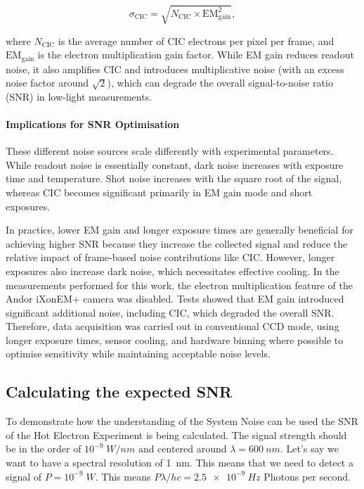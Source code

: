 \documentclass[
	parskip=half,
	a4paper,
]{scrarticle}
\begin{document}
\begin{equation}
    \sigma_{\text{CIC}} = \sqrt{N_{\text{CIC}} \times \text{EM}_{\text{gain}}^2},
\end{equation}

where $N_{\text{CIC}}$ is the average number of CIC electrons per pixel per frame, and $\text{EM}_{\text{gain}}$ is the electron multiplication gain factor. While EM gain reduces readout noise, it also amplifies CIC and introduces multiplicative noise (with an excess noise factor around $\sqrt{2}$), which can degrade the overall signal-to-noise ratio (SNR) in low-light measurements.

\paragraph{Implications for SNR Optimisation}

These different noise sources scale differently with experimental parameters. While readout noise is essentially constant, dark noise increases with exposure time and temperature. Shot noise increases with the square root of the signal, whereas CIC becomes significant primarily in EM gain mode and short exposures.

In practice, lower EM gain and longer exposure times are generally beneficial for achieving higher SNR because they increase the collected signal and reduce the relative impact of frame-based noise contributions like CIC. However, longer exposures also increase dark noise, which necessitates effective cooling. In the measurements performed for this work, the electron multiplication feature of the Andor iXonEM+ camera was disabled. Tests showed that EM gain introduced significant additional noise, including CIC, which degraded the overall SNR. Therefore, data acquisition was carried out in conventional CCD mode, using longer exposure times, sensor cooling, and hardware binning where possible to optimise sensitivity while maintaining acceptable noise levels.

\subsection{Calculating the expected SNR}
To demonstrate how the understanding of the System Noise can be used the SNR of the Hot Electron Experiment is being calculated.
The signal strength should be in the order of $10^{-9}\;\si{W/nm}$ and centered around $\lambda = \SI{600}{nm}$. Let's say we want to have a spectral resolution of \SI{1}{nm}. This means that we need to detect a signal of $P=10^{-9}\;\si{W}$. This means $P \lambda / hc = \SI{2.5e-9}{Hz}$ Photons per second.
\end{document}
